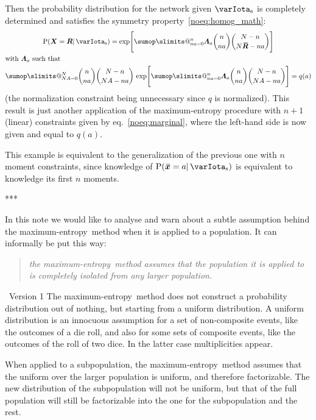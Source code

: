 \documentclass{article}
\makeatletter
\theoremstyle{remark}
\theoremstyle{innote}
\def\sum{\DOTSI\sumop\slimits@}
\renewcommand*{\|}{\mathpunct{|}}%
\newcommand*{\p}{\mathrm{P}}%
\newcommand*{\eqn}{eq.}%
\theoremstyle{simple}
\newcommand*{\puzzle}{{\fontencoding{U}\fontfamily{fontawesometwo}\selectfont\symbol{225}}}
\newcommand{\mynote}[1]{ {\color{notecolour}\puzzle\ #1}}
\newcommand*{\widebar}[1]{{\mkern1.5mu\skew{2}\overline{\mkern-1.5mu#1\mkern-1.5mu}\mkern 1.5mu}}
\newcommand*{\av}{\widebar} %
\newcommand*{\sav}{\widebar} %
\newcommand*{\yxx}{x}%
\newcommand*{\yx}{\bm{\yxx}}%
\newcommand*{\yxs}{\sav{\yx}}%
\newcommand*{\yX}{\bm{X}}%
\newcommand*{\yXf}{\av{\yX}}%
\newcommand*{\yR}{\bm{R}}%
\newcommand*{\yRf}{\av{\yR}}%
\newcommand*{\yHb}{\varIota_\textrm{s}}
\newcommand*{\yL}{\bm{\varLambda}}
\newcommand*{\me}{maximum-entropy}
\makeatother
\begin{document}
\medskip Then the probability distribution for the network given $\yHb$ is
completely determined and satisfies the symmetry
property~\eqref{noeq:homog_math}:
\begin{multline}
  \label{noeq:pop_distr_maxent2}
  \p(\yX= \yR \|\yHb) =
\exp\Biggl[
\sum_{n a=0}^n \yL_{ a}
\binom{n}{n a}
\binom{N-n}{N\yRf-n a}\Biggr]
\\
\!\begin{aligned}[b]
&\text{with $\yL_{ a}$ such that}
\\
&\sum_{N A=0}^N 
\binom{n}{n a}
\binom{N-n}{N A-n a}\,
\exp\Biggl[
\sum_{n a=0}^n \yL_{ a}
\binom{n}{n a}
\binom{N-n}{N A-n a}\Biggr]
=q( a)
\end{aligned}
\end{multline}
(the normalization constraint being unnecessary since $q$ is normalized).
This result is just another application of the maximum-entropy procedure
with $n+1$ (linear) constraints given by \eqn~\eqref{noeq:marginal}, where
the left-hand side is now given and equal to $q(a)$.

This example is equivalent to the generalization of the previous one with
$n$ moment constraints, since knowledge of $\p(\yxs=a \| \yHb)$ is
equivalent to knowledge its first $n$ moments.

***



In this note we would like to analyse and warn about a subtle assumption
behind the \me\ method when it is applied to a population. It can informally
be put this way:
\begin{quote}
  \emph{the \me\ method assumes that the population it is applied to is
    completely isolated from any larger population.}
\end{quote}

\mynote{Version 1}
The \me\ method does not construct a probability distribution out of
nothing, but starting from a uniform distribution. A uniform distribution
is an innocuous assumption for a set of non-composite events, like the
outcomes of a die roll, and also for some sets of composite events, like
the outcomes of the roll of two dice. In the latter case multiplicities
appear.

When applied to a subpopulation, the \me\ method assumes that the uniform over
the larger population is uniform, and therefore factorizable. The new
distribution of the subpopulation will not be uniform, but that of the full
population will still be factorizable into the one for the subpopulation and the
rest.
\end{document}
